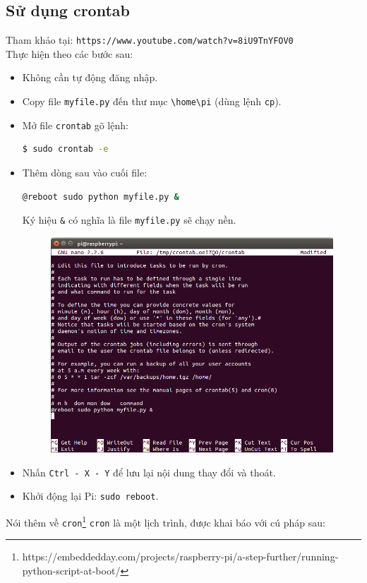 \subsection{Sử dụng crontab}
Tham khảo tại: \verb|https://www.youtube.com/watch?v=8iU9TnYFOV0|\\
Thực hiện theo các bước sau:
\begin{itemize}
\item Không cần tự động đăng nhập.
\item Copy file \verb|myfile.py| đến thư mục \verb|\home\pi| (dùng lệnh \verb|cp|).
\item Mở file \verb|crontab| gõ lệnh:
\begin{lstlisting}[language=bash]
$ sudo crontab -e
\end{lstlisting}
\item Thêm dòng sau vào cuối file: 
\begin{lstlisting}[language=bash]
@reboot sudo python myfile.py &
\end{lstlisting}
Ký hiệu \verb|&| có nghĩa là file \verb|myfile.py| sẽ chạy nền.
\begin{figure}[h!]
\begin{center}
\includegraphics[scale=.5]{run-script-python/images/auto-run-python-1}
\end{center}
\end{figure}
\item Nhấn \verb|Ctrl - X - Y| để lưu lại nội dung thay đổi và thoát.
\item Khởi động lại Pi: \verb|sudo reboot|.
\end{itemize}
Nói thêm về \verb|cron|\footnote{\textsf{https://embeddedday.com/projects/raspberry-pi/a-step-further/running-python-script-at-boot/}} \verb|cron| là một lịch trình, được khai báo với cú pháp sau:

